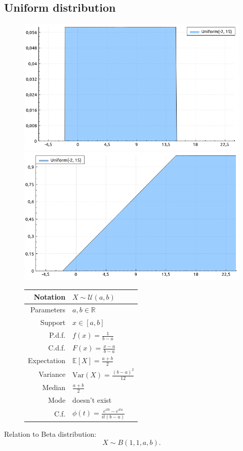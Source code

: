 \documentclass[a4paper,11pt]{article}
\theoremstyle{plain}
\theoremstyle{definition}
\newcommand{\ME}{\mathbb{E}}
\newcommand{\MR}{\mathbb{R}}
\newcommand{\Var}{\mathrm{Var}}
\begin{document}
	\subsection{Uniform distribution}
	\begin{figure}[!htb]\centering
		\begin{minipage}{0.55\textwidth}
			\includegraphics[width=\linewidth, right]{uniform_pdf}
			\captionsetup{labelformat=empty}
			\includegraphics[width=\linewidth, right]{uniform_cdf}
			\captionsetup{labelformat=empty}
		\end{minipage}
		\begin{minipage}{0.4\textwidth}
			\begin{tabular}{| r | l |}
				\hline
				Notation & $ X \sim \mathcal{U}(a, b)$ \\
				\hline
				Parameters & $a, b \in \MR$ \\
				\hline
				Support & $x \in [a, b]$  \\
				\hline
				P.d.f. & $f(x) = \frac{1}{b - a}$ \\
				\hline
				C.d.f. & $F(x)=\frac{x - a}{b - a}$\\
				\hline
				Expectation & $\ME[X] = \frac{a+b}{2}$ \\
				\hline
				Variance & $\Var(X) = \frac{(b-a)^2}{12}$ \\
				\hline
				Median & $\frac{a+b}{2}$ \\
				\hline
				Mode & doesn't exist \\
				\hline
				C.f. & $\phi(t) = \frac{e^{itb}-e^{ita}}{it(b-a)} $ \\
				\hline
			\end{tabular}
		\end{minipage}
	\end{figure}
	Relation to Beta distribution: \[X \sim B(1, 1, a, b). \]
\end{document}
